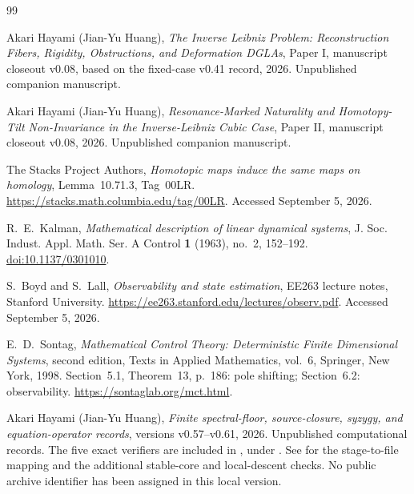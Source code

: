 \documentclass[11pt]{amsart}
\theoremstyle{definition}
\begin{document}
\begin{thebibliography}{99}
\raggedright

Akari Hayami (Jian-Yu Huang),
\emph{The Inverse Leibniz Problem: Reconstruction Fibers, Rigidity, Obstructions, and Deformation DGLAs},
Paper I, manuscript closeout v0.08, based on the fixed-case v0.41 record, 2026.
Unpublished companion manuscript.

Akari Hayami (Jian-Yu Huang),
\emph{Resonance-Marked Naturality and Homotopy-Tilt Non-Invariance in the Inverse-Leibniz Cubic Case},
Paper II, manuscript closeout v0.08, 2026. Unpublished companion manuscript.


The Stacks Project Authors,
\emph{Homotopic maps induce the same maps on homology},
Lemma~10.71.3, Tag~00LR.
\url{https://stacks.math.columbia.edu/tag/00LR}. Accessed September 5, 2026.

R.~E.~Kalman,
\emph{Mathematical description of linear dynamical systems},
J. Soc. Indust. Appl. Math. Ser. A Control \textbf{1} (1963), no.~2, 152--192.
\href{https://doi.org/10.1137/0301010}{doi:10.1137/0301010}.

S.~Boyd and S.~Lall,
\emph{Observability and state estimation},
EE263 lecture notes, Stanford University.
\url{https://ee263.stanford.edu/lectures/observ.pdf}. Accessed September 5, 2026.

E.~D.~Sontag,
\emph{Mathematical Control Theory: Deterministic Finite Dimensional Systems},
second edition, Texts in Applied Mathematics, vol.~6, Springer, New York, 1998.
Section~5.1, Theorem~13, p.~186: pole shifting; Section~6.2: observability.
\url{https://sontaglab.org/mct.html}.

Akari Hayami (Jian-Yu Huang),
\emph{Finite spectral-floor, source-closure, syzygy, and equation-operator records},
versions v0.57--v0.61, 2026. Unpublished computational records.
The five exact verifiers are included in
, under
.
See  for the stage-to-file mapping and the
additional stable-core and local-descent checks. No public archive
identifier has been assigned in this local version.
\end{thebibliography}
\end{document}
